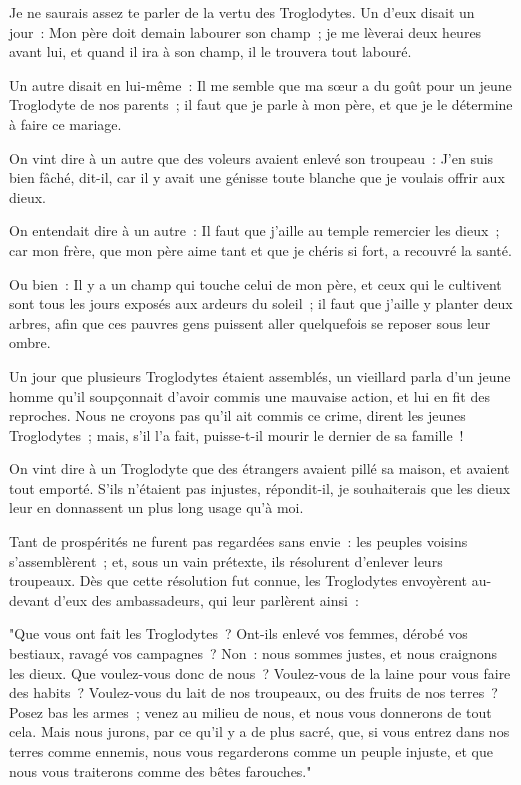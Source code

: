 \documentclass[french,twoside]{book} %
\begin{document}
\noindent Je ne saurais assez te parler de la vertu des Troglodytes. Un d’eux disait un jour : Mon père doit demain labourer son champ ; je me lèverai deux heures avant lui, et quand il ira à son champ, il le trouvera tout labouré.\par
Un autre disait en lui-même : Il me semble que ma sœur a du goût pour un jeune Troglodyte de nos parents ; il faut que je parle à mon père, et que je le détermine à faire ce mariage.\par
On vint dire à un autre que des voleurs avaient enlevé son troupeau : J’en suis bien fâché, dit-il, car il y avait une génisse toute blanche que je voulais offrir aux dieux.\par
On entendait dire à un autre : Il faut que j’aille au temple remercier les dieux ; car mon frère, que mon père aime tant et que je chéris si fort, a recouvré la santé.\par
Ou bien : Il y a un champ qui touche celui de mon père, et ceux qui le cultivent sont tous les jours exposés aux ardeurs du soleil ; il faut que j’aille y planter deux arbres, afin que ces pauvres gens puissent aller quelquefois se reposer sous leur ombre.\par
Un jour que plusieurs Troglodytes étaient assemblés, un vieillard parla d’un jeune homme qu’il soupçonnait d’avoir commis une mauvaise action, et lui en fit des reproches. Nous ne croyons pas qu’il ait commis ce crime, dirent les jeunes Troglodytes ; mais, s’il l’a fait, puisse-t-il mourir le dernier de sa famille !\par
On vint dire à un Troglodyte que des étrangers avaient pillé sa maison, et avaient tout emporté. S’ils n’étaient pas injustes, répondit-il, je souhaiterais que les dieux leur en donnassent un plus long usage qu’à moi.\par
Tant de prospérités ne furent pas regardées sans envie : les peuples voisins s’assemblèrent ; et, sous un vain prétexte, ils résolurent d’enlever leurs troupeaux. Dès que cette résolution fut connue, les Troglodytes envoyèrent au-devant d’eux des ambassadeurs, qui leur parlèrent ainsi :\par
"Que vous ont fait les Troglodytes ? Ont-ils enlevé vos femmes, dérobé vos bestiaux, ravagé vos campagnes ? Non : nous sommes justes, et nous craignons les dieux. Que voulez-vous donc de nous ? Voulez-vous de la laine pour vous faire des habits ? Voulez-vous du lait de nos troupeaux, ou des fruits de nos terres ? Posez bas les armes ; venez au milieu de nous, et nous vous donnerons de tout cela. Mais nous jurons, par ce qu’il y a de plus sacré, que, si vous entrez dans nos terres comme ennemis, nous vous regarderons comme un peuple injuste, et que nous vous traiterons comme des bêtes farouches."\par
\end{document}
